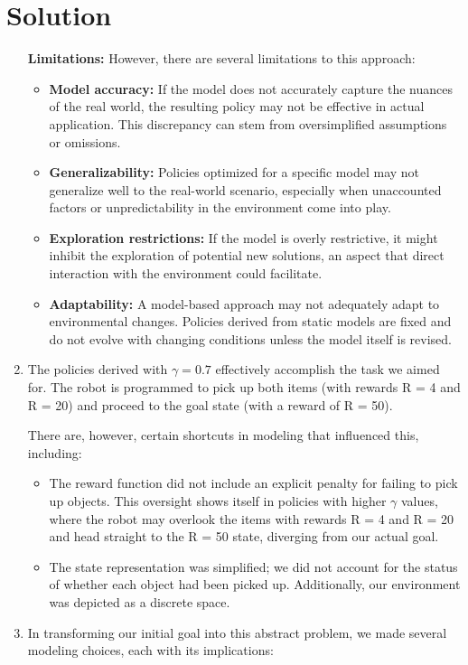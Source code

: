 \documentclass[submit]{harvardml}
\newenvironment{solution}
  {\color{blue}\section*{Solution}}
{}
\begin{document}
\begin{solution}
\begin{enumerate}
\textbf{Limitations:}
However, there are several limitations to this approach:
\begin{itemize}
    \item \textbf{Model accuracy:} If the model does not accurately capture the nuances of the real world, the resulting policy may not be effective in actual application. This discrepancy can stem from oversimplified assumptions or omissions.
    \item \textbf{Generalizability:} Policies optimized for a specific model may not generalize well to the real-world scenario, especially when unaccounted factors or unpredictability in the environment come into play.
    \item \textbf{Exploration restrictions:} If the model is overly restrictive, it might inhibit the exploration of potential new solutions, an aspect that direct interaction with the environment could facilitate.
    \item \textbf{Adaptability:} A model-based approach may not adequately adapt to environmental changes. Policies derived from static models are fixed and do not evolve with changing conditions unless the model itself is revised.
\end{itemize}

\item The policies derived with $\gamma = 0.7$ effectively accomplish the task we aimed for. The robot is programmed to pick up both items (with rewards R = 4 and R = 20) and proceed to the goal state (with a reward of R = 50). 

There are, however, certain shortcuts in modeling that influenced this, including:
\begin{itemize}
    \item The reward function did not include an explicit penalty for failing to pick up objects. This oversight shows itself in policies with higher $\gamma$ values, where the robot may overlook the items with rewards R = 4 and R = 20 and head straight to the R = 50 state, diverging from our actual goal.
    \item The state representation was simplified; we did not account for the status of whether each object had been picked up. Additionally, our environment was depicted as a discrete space.
\end{itemize}

\item In transforming our initial goal into this abstract problem, we made several modeling choices, each with its implications:


\end{enumerate}
\end{solution}
\end{document}
